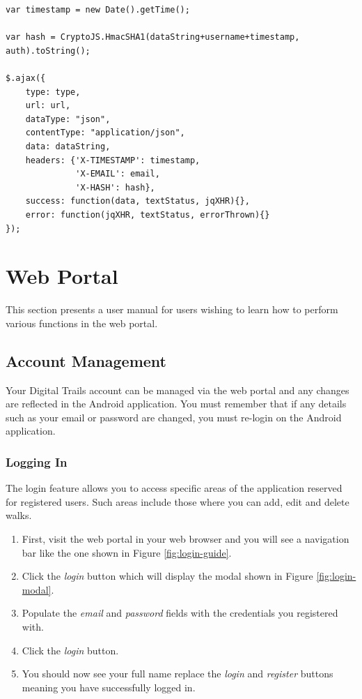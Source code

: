 \documentclass[11pt,a4paper]{report}
\begin{document}
\begin{lstlisting}[captionpos=b, caption=JavaScript Authentication Code., label=lst:authGuide]
var timestamp = new Date().getTime();

var hash = CryptoJS.HmacSHA1(dataString+username+timestamp, auth).toString();

$.ajax({
    type: type,
    url: url,
    dataType: "json",
    contentType: "application/json",
    data: dataString,
    headers: {'X-TIMESTAMP': timestamp,
        	  'X-EMAIL': email,
        	  'X-HASH': hash},
    success: function(data, textStatus, jqXHR){},
    error: function(jqXHR, textStatus, errorThrown){}
});
\end{lstlisting}

\section{Web Portal}

This section presents a user manual for users wishing to learn how to perform various functions in the web portal.

\subsection{Account Management}

Your Digital Trails account can be managed via the web portal and any changes are reflected in the Android application. You must remember that if any details such as your email or password are changed, you must re-login on the Android application.

\subsubsection{Logging In}

The login feature allows you to access specific areas of the application reserved for registered users. Such areas include those where you can add, edit and delete walks.

\begin{enumerate}
\item First, visit the web portal in your web browser and you will see a navigation bar like the one shown in Figure \ref{fig:login-guide}.
\item Click the \emph{login} button which will display the modal shown in Figure \ref{fig:login-modal}.
\item Populate the \emph{email} and \emph{password} fields with the credentials you registered with.
\item Click the \emph{login} button.
\item You should now see your full name replace the \emph{login} and \emph{register} buttons meaning you have successfully logged in.
\end{enumerate}
\end{document}
